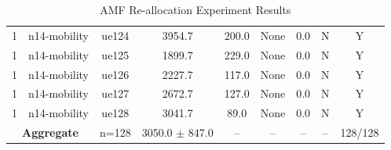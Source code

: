 \begin{table}[ht]
\begin{tabular}{|c|c|c|c|c|c|c|c|c|}
1 & n14-mobility & ue124 & 3954.7 & 200.0 & None & 0.0 & N & Y \\
1 & n14-mobility & ue125 & 1899.7 & 229.0 & None & 0.0 & N & Y \\
1 & n14-mobility & ue126 & 2227.7 & 117.0 & None & 0.0 & N & Y \\
1 & n14-mobility & ue127 & 2672.7 & 127.0 & None & 0.0 & N & Y \\
1 & n14-mobility & ue128 & 3041.7 & 89.0 & None & 0.0 & N & Y \\
\multicolumn{2}{|c|}{\textbf{Aggregate}} & n=128 & 3050.0 $\pm$ 847.0 & -- & -- & -- & -- & 128/128 \\
\hline
\end{tabular}
\caption{AMF Re-allocation Experiment Results}
\label{tab:amf_realloc}
\end{table}
